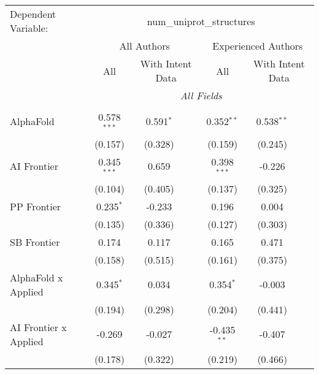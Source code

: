 \begingroup
\centering
\begin{tabular}{lcccccc}
   \tabularnewline \midrule \midrule
   Dependent Variable: & \multicolumn{6}{c}{num\_uniprot\_structures}\\
 & \multicolumn{3}{c}{All Authors} & \multicolumn{3}{c}{Experienced Authors} \\
\cmidrule(lr){2-4} \cmidrule(lr){5-7}
 & \multicolumn{1}{c}{All} & \multicolumn{2}{c}{With Intent Data} & \multicolumn{1}{c}{All} & \multicolumn{2}{c}{With Intent Data} \\
\cmidrule(lr){2-2} \cmidrule(lr){3-4} \cmidrule(lr){5-5} \cmidrule(lr){6-7}
 & \multicolumn{6}{c}{\textit{All Fields}} \\ \\
   AlphaFold                      & 0.578$^{***}$ & 0.591$^{*}$ &               & 0.352$^{**}$  & 0.538$^{**}$ &   \\   
                                  & (0.157)       & (0.328)     &               & (0.159)       & (0.245)      &   \\   
   AI Frontier                    & 0.345$^{***}$ & 0.659       &               & 0.398$^{***}$ & -0.226       &   \\   
                                  & (0.104)       & (0.405)     &               & (0.137)       & (0.325)      &   \\   
   PP Frontier                    & 0.235$^{*}$   & -0.233      &               & 0.196         & 0.004        &   \\   
                                  & (0.135)       & (0.336)     &               & (0.127)       & (0.303)      &   \\   
   SB Frontier                    & 0.174         & 0.117       &               & 0.165         & 0.471        &   \\   
                                  & (0.158)       & (0.515)     &               & (0.161)       & (0.375)      &   \\   
   AlphaFold x Applied            & 0.345$^{*}$   & 0.034       &               & 0.354$^{*}$   & -0.003       &   \\   
                                  & (0.194)       & (0.298)     &               & (0.204)       & (0.441)      &   \\   
   AI Frontier x Applied          & -0.269        & -0.027      &               & -0.435$^{**}$ & -0.407       &   \\   
                                  & (0.178)       & (0.322)     &               & (0.219)       & (0.466)      &   \\   

\end{tabular}
